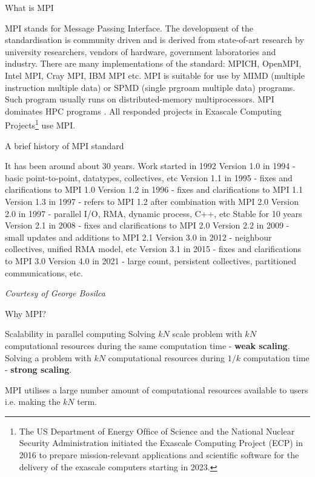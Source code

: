 \documentclass[xcolor=dvipsnames]{beamer}
\begin{document}
\begin{frame}{What is MPI}
\begin{outline}
    \1 MPI stands for Message Passing Interface.
    \2 The development of the standardisation is community driven and is derived from state-of-art research by university researchers, vendors of hardware, government laboratories and industry.
    \pause
    \2 There are many implementations of the standard: MPICH, OpenMPI, Intel MPI, Cray MPI, IBM MPI etc.
    \1 MPI is suitable for use by MIMD (multiple instruction multiple data)  or SPMD (single prgroam multiple data) programs.
    \2 Such program usually runs on distributed-memory multiprocessors.
    \pause
    \1 MPI dominates HPC programs \cite{evans2022survey}.
    \2 All responded projects in Exascale Computing Projects\footnote{The US Department of Energy Ofﬁce of Science and the National Nuclear Security Administration initiated the Exascale
Computing Project (ECP) in 2016 to prepare mission-relevant applications and scientiﬁc software for the delivery of the
exascale computers starting in 2023.} use MPI.
\end{outline}
\end{frame}

\begin{frame}{A brief history of MPI standard}
\begin{outline}
\1 It has been around about 30 years.
\2 Work started in 1992
\2 Version 1.0 in 1994 - basic point-to-point, datatypes, collectives, etc
\2 Version 1.1 in 1995 - fixes and clarifications to MPI 1.0
\2 Version 1.2 in 1996 - fixes and clarifications to MPI 1.1
\2 Version 1.3 in 1997 - refers to MPI 1.2 after combination with MPI 2.0
\2 Version 2.0 in 1997 - parallel I/O, RMA, dynamic process, C++, etc
\2 Stable for 10 years
\2 Version 2.1 in 2008 - fixes and clarifications  to MPI 2.0
\2 Version 2.2 in 2009 - small updates  and additions to MPI 2.1
\2 Version 3.0 in 2012 - neighbour collectives, unified RMA model, etc
\2 Version 3.1 in 2015 - fixes and clarifications to MPI 3.0
\2 Version 4.0 in 2021 - large count, persistent collectives, partitioned communications, etc.

\footnotesize\textit{Courtesy of George Bosilca}
\end{outline}
\end{frame}

\begin{frame}{Why MPI?}
\begin{outline}
\1 Scalability in parallel computing
\2 Solving $kN$ scale problem with $kN$ computational resources during the same computation time - \textbf{weak scaling}.
\pause
\2 Solving a problem with $kN$ computational resources during $1/k$ computation time - \textbf{strong scaling}.
\end{outline}
\pause
\begin{block}{}
MPI utilises a large number amount of computational resources available to users i.e. making the $kN$ term.
\end{block}
\end{frame}
\end{document}
